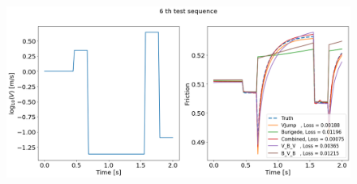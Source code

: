 \begin{figure}[H]
    \centering
    \includegraphics[width=1.0\textwidth]{./images/Trial0112_VJump6.png}
\end{figure}

\newpage
